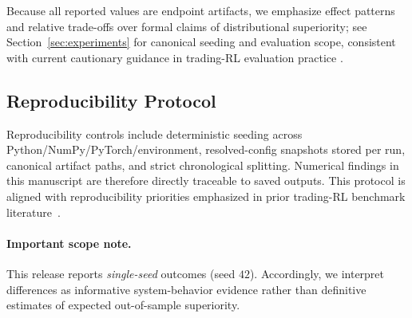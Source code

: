 Because all reported values are endpoint artifacts, we emphasize effect patterns and relative trade-offs over formal claims of distributional superiority; see Section~\ref{sec:experiments} for canonical seeding and evaluation scope, consistent with current cautionary guidance in trading-RL evaluation practice \citep{zhang2020deep}.

\subsection{Reproducibility Protocol}
Reproducibility controls include deterministic seeding across Python/NumPy/PyTorch/environment, resolved-config snapshots stored per run, canonical artifact paths, and strict chronological splitting. Numerical findings in this manuscript are therefore directly traceable to saved outputs. This protocol is aligned with reproducibility priorities emphasized in prior trading-RL benchmark literature~\citep{liu2021finrl,zhang2020deep}.

\paragraph{Important scope note.}
This release reports \emph{single-seed} outcomes (seed $42$). Accordingly, we interpret differences as informative system-behavior evidence rather than definitive estimates of expected out-of-sample superiority.
